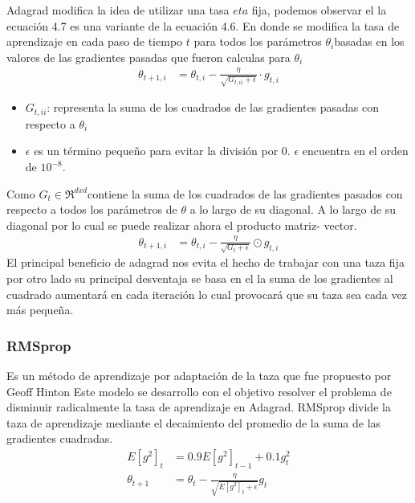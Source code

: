 Adagrad modifica la idea de utilizar una tasa $eta$ fija, podemos observar el la ecuación 4.7 es una variante de la ecuación 4.6. En donde se modifica la tasa de aprendizaje en cada paso de tiempo $t$ para todos los parámetros $\theta_{i} $basadas en los valores de las gradientes pasadas que fueron calculas para $\theta_{i}$
\begin{equation}
\label{adagrad2}
\begin{aligned}
\theta_{t+1,i} &= \theta_{t,i} - \frac{\eta}{\sqrt{G_{t,ii}+\epsilon}} \cdot g_{t,i}
\end{aligned}
\end{equation}

\begin{itemize}
	\item $G_{t,ii}$: representa la suma de los cuadrados de las gradientes pasadas con respecto a $\theta_{i}$
	\item $\epsilon $ es un término pequeño para evitar la división por 0. $\epsilon$ encuentra en el orden de $10^{-8}$.
\end{itemize}
Como $G_{t} \in \Re^{dxd} $contiene la suma de los cuadrados de las gradientes pasados con respecto a todos los parámetros de $\theta$ a lo largo de su diagonal. A lo largo  de su diagonal por lo cual se puede realizar ahora el producto matriz- vector.
\begin{equation}
\label{adagrad3}
\begin{aligned}
\theta_{t+1,i} &= \theta_{t,i} - \frac{\eta}{\sqrt{G_{t}+\epsilon}} \odot g_{t,i}
\end{aligned}
\end{equation}
El principal beneficio de adagrad nos evita el hecho de trabajar con una taza fija por otro lado su principal desventaja se basa en el la suma de los gradientes al cuadrado aumentará en cada iteración lo cual provocará que su taza sea cada vez más pequeña.


\subsubsection{RMSprop}
Es un método de aprendizaje por adaptación de la taza que fue propuesto por Geoff Hinton
Este modelo se desarrollo con el objetivo resolver el problema de disminuir radicalmente la tasa de aprendizaje en Adagrad. RMSprop divide la taza de aprendizaje mediante el decaimiento del promedio de la suma de las gradientes cuadradas.
\begin{equation}
\label{RMS}
\begin{aligned}
E[g^2]_{t} &= 0.9 E[g^2]_{t-1} + 0.1 g^{2}_{t}\\
\theta_{t+1} &= \theta_{t} - \frac{\eta}{\sqrt{E[g^2]_{t} +\epsilon }} g_{t}
\end{aligned}
\end{equation}

